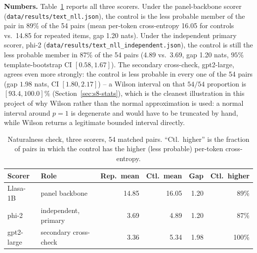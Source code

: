 \documentclass[11pt]{article}
\begin{document}
\textbf{Numbers.} Table~\ref{tab:naturalness} reports all three scorers. Under
the panel-backbone scorer (\texttt{data/results/text\_nll.json}), the control
is the less probable member of the pair in 89\% of the 54
pairs (mean per-token cross-entropy 16.05 for controls vs.\ 14.85 for
repeated items, gap 1.20 nats). Under the independent primary scorer,
phi-2 (\texttt{data/results/text\_nll\_independent.json}), the control is
still the less probable member in 87\% of the 54 pairs
(4.89 vs.\ 3.69, gap 1.20 nats, $95\%$ template-bootstrap
CI $[0.58, 1.67]$). The secondary cross-check, gpt2-large, agrees even more
strongly: the control is less probable in every one of the 54 pairs (gap
$1.98$ nats, CI $[1.80, 2.17]$) -- a Wilson interval on that $54/54$
proportion is $[93.4, 100.0]\%$ (Section~\ref{sec:s8-stats}), which is the
cleanest illustration in this project of why Wilson rather than the normal
approximation is used: a normal interval around $p=1$ is degenerate and would
have to be truncated by hand, while Wilson returns a legitimate bounded
interval directly.

\begin{table}[h]
\centering
\caption{Naturalness check, three scorers, 54 matched pairs.
``Ctl.\ higher'' is the fraction of pairs in which the control has the
higher (less probable) per-token cross-entropy.}
\label{tab:naturalness}
\small
\begin{tabular}{@{}lp{2.1cm}rrrr@{}}
\toprule
Scorer & Role & Rep.\ mean & Ctl.\ mean & Gap & Ctl.\ higher \\
\midrule
Llasa-1B & panel backbone & 14.85 & 16.05 & 1.20 & 89\% \\
phi-2 & independent, primary & 3.69 & 4.89 & 1.20 & 87\% \\
gpt2-large & secondary cross-check & 3.36 & 5.34 & 1.98 & 100\% \\
\bottomrule
\end{tabular}
\end{table}
\end{document}
